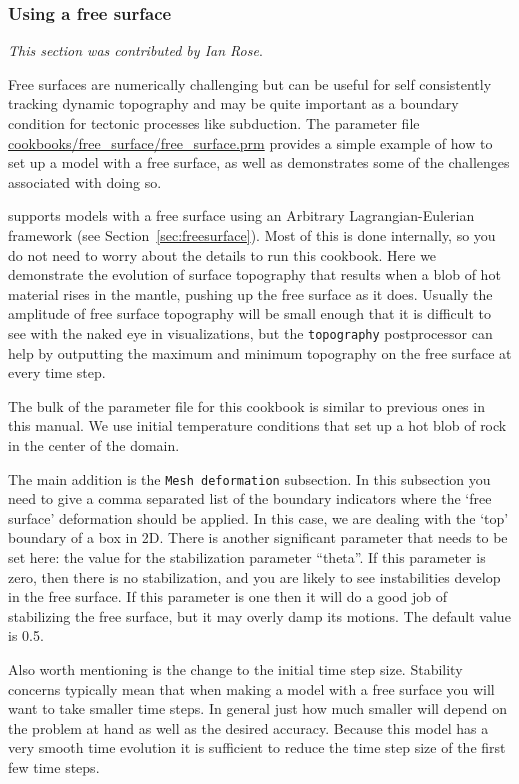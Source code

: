 \subsubsection{Using a free surface}
\label{sec:cookbooks-freesurface}
\textit{This section was contributed by Ian Rose}.

Free surfaces are numerically challenging but can be useful for self consistently
tracking dynamic topography and may be quite important as a boundary condition
for tectonic processes like subduction. The parameter file \url{cookbooks/free_surface/free_surface.prm} 
provides a simple example of how to set up a model with a free surface, as well 
as demonstrates some of the challenges associated with doing so.

\aspect{} supports models with a free surface using an Arbitrary Lagrangian-Eulerian 
framework (see Section~\ref{sec:freesurface}). Most of this is done internally, so you do not need to worry about the
details to run this cookbook.  Here we demonstrate the evolution of surface topography 
that results when a blob of hot material rises in the mantle, pushing up the free
surface as it does.  Usually the amplitude of free surface topography 
will be small enough that it is difficult to see with the naked eye in visualizations,
but the \texttt{topography} postprocessor can help by outputting the maximum and minimum 
topography on the free surface at every time step. 

The bulk of the parameter file for this cookbook is similar to previous ones in this manual.
We use initial temperature conditions that set up a hot blob of rock in the center of the 
domain.

The main addition is the \texttt{Mesh deformation} subsection.
In this subsection you need to give \aspect{} a comma
separated list of the boundary indicators where the `free surface' deformation should be applied.
In this case, we are dealing with the `top' boundary of a box in 2D.
There is another significant parameter that needs to be set here: the value for the stabilization parameter ``theta''.
If this parameter is zero, then there is no stabilization, and you are likely to
see instabilities develop in the free surface. If this parameter is one then it
will do a good job of stabilizing the free surface, but it may overly damp its 
motions. The default value is 0.5.

Also worth mentioning is the change to the initial time step size. Stability concerns typically 
mean that when making a model with a free surface you will want to take smaller 
time steps. In general just how much smaller will depend on the problem at hand
as well as the desired accuracy. Because this model has a very smooth time evolution
it is sufficient to reduce the time step size of the first few time steps.

